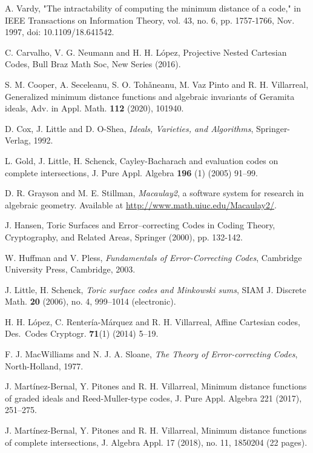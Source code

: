 \documentclass[12pt]{amsart}
\theoremstyle{plain}
\begin{document}
\begin{thebibliography}{99}


 A. Vardy, "The intractability of computing the minimum distance of a code," in IEEE Transactions on Information Theory, vol. 43, no. 6, pp. 1757-1766, Nov. 1997, doi: 10.1109/18.641542.

 C. Carvalho, V. G. Neumann and H. H. L\'opez,
Projective Nested Cartesian Codes,
Bull Braz Math Soc, New Series (2016).

 S. M. Cooper, A. Seceleanu, S. O. Toh\v{a}neanu,
M. Vaz Pinto and R. H. Villarreal, 
Generalized minimum distance functions and algebraic invariants of
Geramita ideals, Adv. in Appl. Math. {\bf 112} (2020), 101940.

D. Cox, J. Little and D. O-Shea,
{\it Ideals, Varieties, and Algorithms}, Springer-Verlag, 1992.

 L. Gold, J. Little, H. Schenck,
{Cayley-Bacharach and evaluation codes on complete intersections},
 J. Pure Appl. Algebra  {\bf 196} (1) (2005) 91--99.

 D. R. Grayson and M. E. Stillman,
{\it Macaulay2}, a software system for research in algebraic geometry.
Available at \url{http://www.math.uiuc.edu/Macaulay2/}.

 J. Hansen, { Toric Surfaces and Error--correcting
    Codes} in Coding Theory, Cryptography, and Related Areas, Springer
 (2000), pp. 132-142.

 W. Huffman and V. Pless,
{\it Fundamentals of Error-Correcting Codes},
Cambridge University Press, Cambridge, 2003.

 J. Little, H. Schenck,
{\em Toric surface codes and Minkowski sums},
SIAM J. Discrete Math. {\bf  20}  (2006),  no. 4, 999--1014 (electronic).

 H. H. L\'opez, C. Renter\'ia-M\'arquez and R. H. Villarreal,
Affine Cartesian codes,
Des.\ Codes Cryptogr. \textbf{71}(1) (2014) 5--19.

 F. J. MacWilliams and N. J. A. Sloane, 
{\it The Theory of Error-correcting Codes}, North-Holland, 1977.

 J. Mart\'inez-Bernal, Y. Pitones and R. H. Villarreal,
Minimum distance functions of graded ideals and Reed-Muller-type codes,
J. Pure Appl. Algebra 221 (2017), 251--275.


 J. Mart\'inez-Bernal, Y. Pitones and R. H. Villarreal,
Minimum distance functions of complete intersections,
J. Algebra Appl. 17 (2018), no. 11, 1850204 (22 pages).


\end{thebibliography}
\end{document}
